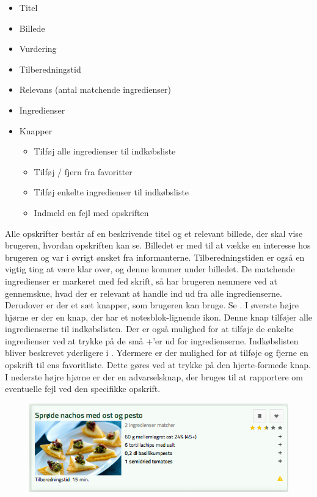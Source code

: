 \begin{itemize}[noitemsep]
  \item Titel
  \item Billede
  \item Vurdering
  \item Tilberedningstid
  \item Relevans (antal matchende ingredienser)
  \item Ingredienser
  \item Knapper
    \begin{itemize}[noitemsep]
      \item Tilføj alle ingredienser til indkøbsliste
      \item Tilføj / fjern fra favoritter
      \item Tilføj enkelte ingredienser til indkøbsliste
      \item Indmeld en fejl med opskriften
    \end{itemize}
\end{itemize}

Alle opskrifter består af en beskrivende titel og et relevant billede, der skal vise brugeren, hvordan opskriften kan se. Billedet er med til at vække en interesse hos brugeren og var i øvrigt ønsket fra informanterne. Tilberedningstiden er også en vigtig ting at være klar over, og denne kommer under billedet. De matchende ingredienser er markeret med fed skrift, så har brugeren nemmere ved at gennemskue, hvad der \fx er relevant at handle ind ud fra alle ingredienserne. Derudover er der et sæt knapper, som brugeren kan bruge. Se . I øverste højre hjørne er der en knap, der har et notesblok-lignende ikon. Denne knap tilføjer alle ingredienserne til indkøbslisten. Der er også mulighed for at tilføje de enkelte ingredienser ved at trykke på de små +'er ud for ingredienserne. Indkøbslisten bliver beskrevet yderligere i . 
Ydermere er der mulighed for at tilføje og fjerne en opskrift til ens favoritliste. Dette gøres ved at trykke på den hjerte-formede knap. I nederste højre hjørne er der en advarselsknap, der bruges til at rapportere om eventuelle fejl ved den specifikke opskrift.

\begin{figure}[ht]
	\centering
	\includegraphics[scale=0.5]{billeder/foodl/opskrift.png}
	\label{fig:foodl-opskrift}
\end{figure}


